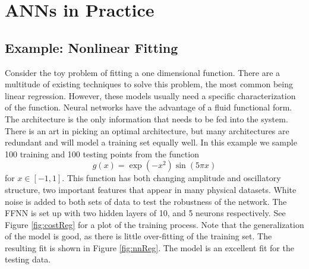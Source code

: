 \section{ANNs in Practice}
\label{ann_practice}
%
\subsection{Example: Nonlinear Fitting}

Consider the toy problem of fitting a one dimensional function. There are a multitude of existing techniques to solve this problem, the most common being linear regression. However, these models usually need a specific characterization of the function. Neural networks have the advantage of a fluid functional form. The architecture is the only information that needs to be fed into the system. There is an art in picking an optimal architecture, but many architectures are redundant and will model a training set equally well. In this example we sample 100 training and 100 testing points from the function
\begin{equation} \label{g}
g(x) = \exp(-x^2)\sin(5\pi x)
\end{equation}
for $x\in[-1, 1]$. This function has both changing amplitude and oscillatory structure, two important features that appear in many physical datasets. White noise is added to both sets of data to test the robustness of the network. The FFNN is set up with two hidden layers of 10, and 5 neurons respectively. See Figure \ref{fig:costReg} for a plot of the training process. Note that the generalization of the model is good, as there is little over-fitting of the training set. The resulting fit is shown in Figure \ref{fig:nnReg}. The model is an excellent fit for the testing data.
%
